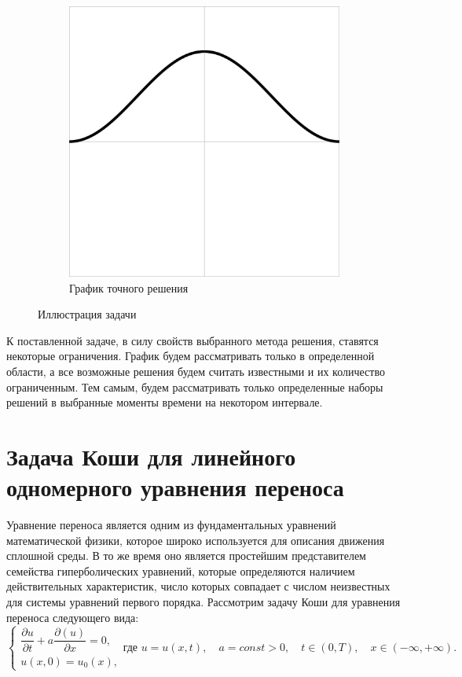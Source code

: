 \documentclass[12pt, a4paper]{article}
\begin{document}
\begin{figure}[h]
\begin{subfigure}[b]{0.45\textwidth}
		\includegraphics[width=\textwidth]{test4}
		\caption{График точного решения}
		\label{image2}
	\end{subfigure}
	\caption{Иллюстрация задачи}
\end{figure}

К поставленной задаче, в силу свойств выбранного метода решения, ставятся некоторые ограничения. График будем рассматривать только в определенной области, а все возможные решения будем считать известными и их количество ограниченным. Тем самым, будем рассматривать только определенные наборы решений в выбранные моменты времени на некотором интервале.

\section{Задача Коши для линейного одномерного уравнения переноса}
Уравнение переноса является одним из фундаментальных уравнений математической физики, которое широко используется для описания движения сплошной среды. В то же время оно является простейшим представителем семейства гиперболических уравнений, которые определяются наличием действительных характеристик, число которых совпадает с числом неизвестных для системы уравнений первого порядка. Рассмотрим задачу Коши для уравнения переноса следующего вида:
\begin{equation}
	\begin{cases}
		\dfrac{\partial u}{\partial t} + a\dfrac{\partial (u)}{\partial x} = 0, \\
		u(x, 0) = u_0(x),
	\end{cases} 
	\text{где } u = u(x, t), \quad a = const > 0, \quad t \in (0, T), \quad x \in (-\infty, +\infty) .
\end{equation}
\end{document}
